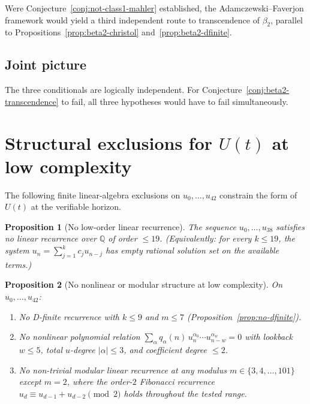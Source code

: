 \documentclass[11pt,a4paper]{article}
\newtheorem{proposition}{Proposition}
\theoremstyle{remark}
\theoremstyle{plain}
\begin{document}
Were Conjecture~\ref{conj:not-class1-mahler} established, the Adamczewski--Faverjon
framework would yield a third independent route to transcendence of
$\beta_2$, parallel to Propositions~\ref{prop:beta2-christol} and~\ref{prop:beta2-dfinite}.

\subsection{Joint picture}

The three conditionals are logically independent.  For
Conjecture~\ref{conj:beta2-transcendence} to fail, all three hypotheses
would have to fail simultaneously.

\section{Structural exclusions for $U(t)$ at low complexity}
\label{sec:structural-negatives}

The following finite linear-algebra exclusions on $u_0, \ldots, u_{42}$
constrain the form of $U(t)$ at the verifiable horizon.

\begin{proposition}[No low-order linear recurrence]
\label{prop:no-recurrence}
The sequence $u_0, \ldots, u_{38}$ satisfies no linear recurrence over
$\mathbb{Q}$ of order $\le 19$.  (Equivalently: for every $k \le 19$,
the system $u_n = \sum_{j=1}^k c_j u_{n-j}$ has empty rational solution
set on the available terms.)
\end{proposition}

\begin{proposition}[No nonlinear or modular structure at low complexity]
\label{prop:no-recurrence-strong}
On $u_0, \ldots, u_{42}$:
\begin{enumerate}
\item[\textnormal{(i)}] No D-finite recurrence with $k \le 9$ and
$m \le 7$ (Proposition~\ref{prop:no-dfinite}).
\item[\textnormal{(ii)}] No nonlinear polynomial relation $\sum_\alpha q_\alpha(n)\,u_n^{\alpha_0} \cdots u_{n-w}^{\alpha_w} = 0$
with lookback $w \le 5$, total $u$-degree $|\alpha| \le 3$, and
coefficient degree $\le 2$.
\item[\textnormal{(iii)}] No non-trivial modular linear recurrence at
any modulus $m \in \{3, 4, \ldots, 101\}$ except $m = 2$, where the
order-$2$ Fibonacci recurrence $u_d \equiv u_{d-1} + u_{d-2} \pmod 2$
holds throughout the tested range.
\end{enumerate}
\end{proposition}
\end{document}
